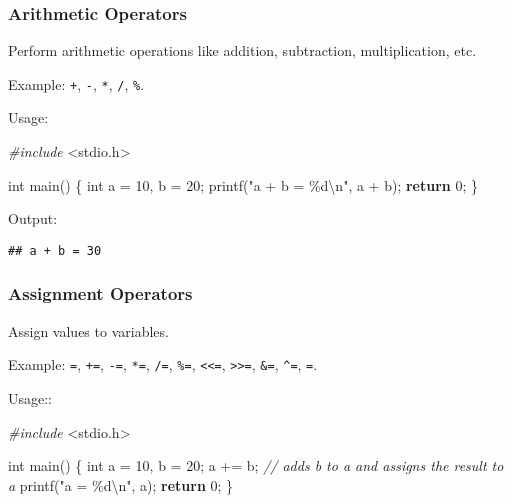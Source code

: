 \documentclass[
]{article}
\newenvironment{Shaded}{\begin{snugshade}}{\end{snugshade}}
\newcommand{\CommentTok}[1]{\textcolor[rgb]{0.56,0.35,0.01}{\textit{#1}}}
\newcommand{\ControlFlowTok}[1]{\textcolor[rgb]{0.13,0.29,0.53}{\textbf{#1}}}
\newcommand{\DataTypeTok}[1]{\textcolor[rgb]{0.13,0.29,0.53}{#1}}
\newcommand{\DecValTok}[1]{\textcolor[rgb]{0.00,0.00,0.81}{#1}}
\newcommand{\ImportTok}[1]{#1}
\newcommand{\NormalTok}[1]{#1}
\newcommand{\PreprocessorTok}[1]{\textcolor[rgb]{0.56,0.35,0.01}{\textit{#1}}}
\newcommand{\SpecialCharTok}[1]{\textcolor[rgb]{0.00,0.00,0.00}{#1}}
\newcommand{\StringTok}[1]{\textcolor[rgb]{0.31,0.60,0.02}{#1}}
\begin{document}
\hypertarget{arithmetic-operators}{%
\subsubsection{Arithmetic Operators}\label{arithmetic-operators}}

Perform arithmetic operations like addition, subtraction,
multiplication, etc.

Example: \texttt{+}, \texttt{-}, \texttt{*}, \texttt{/}, \texttt{\%}.

Usage:

\begin{Shaded}
\begin{Highlighting}[]
\PreprocessorTok{\#include }\ImportTok{\textless{}stdio.h\textgreater{}}

\DataTypeTok{int}\NormalTok{ main() \{}
    \DataTypeTok{int}\NormalTok{ a = }\DecValTok{10}\NormalTok{, b = }\DecValTok{20}\NormalTok{;}
\NormalTok{    printf(}\StringTok{"a + b = \%d}\SpecialCharTok{\textbackslash{}n}\StringTok{"}\NormalTok{, a + b);}
    \ControlFlowTok{return} \DecValTok{0}\NormalTok{;}
\NormalTok{\}}
\end{Highlighting}
\end{Shaded}

Output:

\begin{verbatim}
## a + b = 30
\end{verbatim}

\hypertarget{assignment-operators}{%
\subsubsection{Assignment Operators}\label{assignment-operators}}

Assign values to variables.

Example: \texttt{=}, \texttt{+=}, \texttt{-=}, \texttt{*=}, \texttt{/=},
\texttt{\%=}, \texttt{\textless{}\textless{}=},
\texttt{\textgreater{}\textgreater{}=}, \texttt{\&=}, \texttt{\^{}=},
\texttt{\textbar{}=}.

Usage::

\begin{Shaded}
\begin{Highlighting}[]
\PreprocessorTok{\#include }\ImportTok{\textless{}stdio.h\textgreater{}}

\DataTypeTok{int}\NormalTok{ main() \{}
    \DataTypeTok{int}\NormalTok{ a = }\DecValTok{10}\NormalTok{, b = }\DecValTok{20}\NormalTok{;}
\NormalTok{    a += b;    }\CommentTok{// adds b to a and assigns the result to a}
\NormalTok{    printf(}\StringTok{"a = \%d}\SpecialCharTok{\textbackslash{}n}\StringTok{"}\NormalTok{, a);}
    \ControlFlowTok{return} \DecValTok{0}\NormalTok{;}
\NormalTok{\}}
\end{Highlighting}
\end{Shaded}
\end{document}
